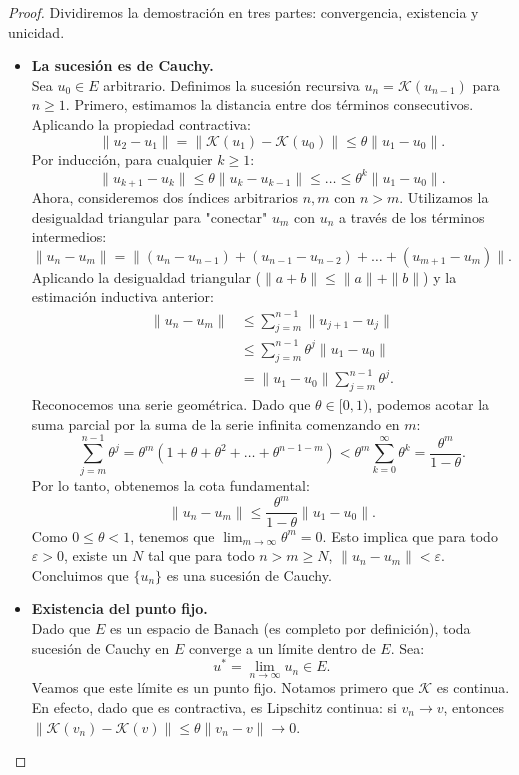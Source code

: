\begin{proof}
    Dividiremos la demostración en tres partes: convergencia, existencia y unicidad.

    \begin{itemize}
        \item \textbf{La sucesión es de Cauchy.}\\
        Sea $u_0 \in E$ arbitrario. Definimos la sucesión recursiva $u_n = \mathcal{K}(u_{n-1})$ para $n \geq 1$.
        Primero, estimamos la distancia entre dos términos consecutivos. Aplicando la propiedad contractiva:
        \[
            \| u_2 - u_1 \| = \| \mathcal{K}(u_1) - \mathcal{K}(u_0) \| \leq \theta \| u_1 - u_0 \|.
        \]
        Por inducción, para cualquier $k \geq 1$:
        \[
            \| u_{k+1} - u_k \| \leq \theta \| u_k - u_{k-1} \| \leq \dots \leq \theta^k \| u_1 - u_0 \|.
        \]
        Ahora, consideremos dos índices arbitrarios $n, m$ con $n > m$. Utilizamos la desigualdad triangular para "conectar" $u_m$ con $u_n$ a través de los términos intermedios:
        \[
            \| u_n - u_m \| = \| (u_n - u_{n-1}) + (u_{n-1} - u_{n-2}) + \dots + (u_{m+1} - u_m) \|.
        \]
        Aplicando la desigualdad triangular ($ \|a+b\| \leq \|a\| + \|b\| $) y la estimación inductiva anterior:
        \begin{align*}
            \| u_n - u_m \| &\leq \sum_{j=m}^{n-1} \| u_{j+1} - u_j \| \\
            &\leq \sum_{j=m}^{n-1} \theta^j \| u_1 - u_0 \| \\
            &= \| u_1 - u_0 \| \sum_{j=m}^{n-1} \theta^j.
        \end{align*}
        Reconocemos una serie geométrica. Dado que $\theta \in [0, 1)$, podemos acotar la suma parcial por la suma de la serie infinita comenzando en $m$:
        \[
            \sum_{j=m}^{n-1} \theta^j = \theta^m (1 + \theta + \theta^2 + \dots + \theta^{n-1-m}) < \theta^m \sum_{k=0}^{\infty} \theta^k = \frac{\theta^m}{1-\theta}.
        \]
        Por lo tanto, obtenemos la cota fundamental:
        \[
            \| u_n - u_m \| \leq \frac{\theta^m}{1-\theta} \| u_1 - u_0 \|.
        \]
        Como $0 \leq \theta < 1$, tenemos que $\lim_{m \to \infty} \theta^m = 0$. Esto implica que para todo $\varepsilon > 0$, existe un $N$ tal que para todo $n > m \geq N$, $\| u_n - u_m \| < \varepsilon$. Concluimos que $\{ u_n \}$ es una sucesión de Cauchy.

        \item \textbf{Existencia del punto fijo.}\\
        Dado que $E$ es un espacio de Banach (es completo por definición), toda sucesión de Cauchy en $E$ converge a un límite dentro de $E$. Sea:
        \[
            u^{*} = \lim_{n \to \infty} u_n \in E.
        \]
        Veamos que este límite es un punto fijo. Notamos primero que $\mathcal{K}$ es continua. En efecto, dado que es contractiva, es Lipschitz continua: si $v_n \to v$, entonces $\| \mathcal{K}(v_n) - \mathcal{K}(v) \| \leq \theta \| v_n - v \| \to 0$.
        

\end{itemize}
\end{proof}
